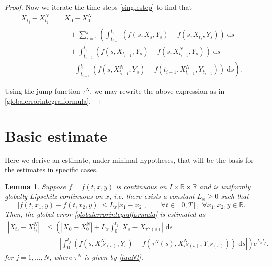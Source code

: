 \documentclass[reqno,12pt]{amsart}
\theoremstyle{plain}%
\newtheorem{lem}{Lemma}[section]
\theoremstyle{definition}
\begin{document}
\begin{proof}
Now we iterate the time steps \eqref{singlestep} to find that
\begin{align*}
    X_{t_j} - X_{t_j}^N & = X_0 - X_0^N \\
    & \qquad + \sum_{i=1}^{j} \left(\int_{t_{i-1}}^{t_i} \left( f(s, X_s, Y_s) - f(s, X_{t_{i}}, Y_s) \right)\;\mathrm{d}s \right. \\ 
    & \qquad + \int_{t_{i-1}}^{t_i} \left( f(s, X_{t_{i-1}}, Y_s) - f(s, X_{t_{i-1}}^N, Y_s) \right)\;\mathrm{d}s \\
    & \qquad \left. + \int_{t_{i-1}}^{t_i} \left( f(s, X_{t_{i-1}}^N, Y_s) - f(t_{i-1}, X_{t_{i-1}}^N, Y_{t_{i-1}}) \right)\;\mathrm{d}s \right).
\end{align*}

Using the jump function $\tau^N$, we may rewrite the above expression as in \eqref{globalerrorintegralformula}.
\end{proof}

\section{Basic estimate}

Here we derive an estimate, under minimal hypotheses, that will be the basis for the estimates in specific cases.

\begin{lem}
    Suppose $f=f(t, x, y)$ is continuous on $I\times \mathbb{R}\times\mathbb{R}$ and is uniformly globally Lipschitz continuous on $x$, i.e. there exists a constant $L_x \geq 0$ such that
    \begin{equation}
        \label{Lxassumptionbasic}
        |f(t, x_1, y) - f(t, x_2, y)| \leq L_x |x_1 - x_2|, \qquad \forall t \in [0, T], \;\forall x_1, x_2, y\in\mathbb{R}.
    \end{equation}
    Then, the global error \eqref{globalerrorintegralformula} is estimated as
    \begin{equation}
        \label{Etjbasicbound}
        \begin{aligned}
            |X_{t_j} - X_{t_j}^N| & \leq \left( |X_0 - X_0^N| + L_x \int_0^{t_j} |X_s - X_{\tau^N(s)}| \;\mathrm{d}s \right. \\
            & \qquad \left. \left|\int_0^{t_j} \left( f(s, X_{\tau^N(s)}^N, Y_s) - f(\tau^N(s), X_{\tau^N(s)}^N, Y_{\tau^N(s)}) \right)\;\mathrm{d}s\right| \right) e^{L_x t_j}.
        \end{aligned}
    \end{equation}
    for $j=1, \ldots, N$, where $\tau^N$ is given by \eqref{tauNt}.
\end{lem}
\end{document}
